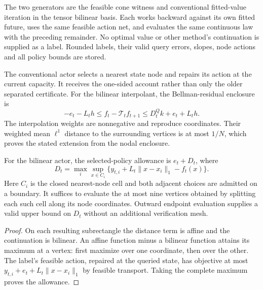 The two generators are the feasible cone witness and conventional fitted-value iteration in the tensor bilinear basis. Each works backward against its own fitted future, uses the same feasible action net, and evaluates the same continuous law with the preceding remainder. No optimal value or other method's continuation is supplied as a label. Rounded labels, their valid query errors, slopes, node actions and all policy bounds are stored.

The conventional actor selects a nearest state node and repairs its action at the current capacity. It receives the one-sided account rather than only the older separated certificate. For the bilinear interpolant, the Bellman-residual enclosure is
\[
 -e_t-L_th\le f_t-\mathcal T_tf_{t+1}
       \le D_t^Qk+e_t+L_th.
\]
The interpolation weights are nonnegative and reproduce coordinates. Their weighted mean $\ell^1$ distance to the surrounding vertices is at most $1/N$, which proves the stated extension from the nodal enclosure.

\begin{lemma}\label{lem:corners47}
For the bilinear actor, the selected-policy allowance is $e_t+D_t$, where
\[
 D_t=\max_i\sup_{x\in C_i}
       \{y_{t,i}+L_t\|x-x_i\|_1-f_t(x)\}.
\]
Here $C_i$ is the closed nearest-node cell and both adjacent choices are admitted on a boundary. It suffices to evaluate the at most nine vertices obtained by splitting each such cell along its node coordinates. Outward endpoint evaluation supplies a valid upper bound on $D_t$ without an additional verification mesh.
\end{lemma}
\begin{proof}
On each resulting subrectangle the distance term is affine and the continuation is bilinear. An affine function minus a bilinear function attains its maximum at a vertex: first maximize over one coordinate, then over the other. The label's feasible action, repaired at the queried state, has objective at most $y_{t,i}+e_t+L_t\|x-x_i\|_1$ by feasible transport. Taking the complete maximum proves the allowance.
\end{proof}

